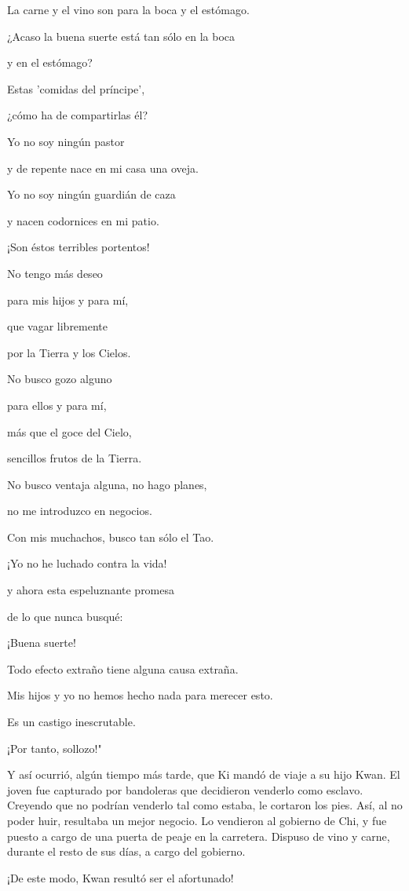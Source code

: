 La carne y el vino son para la boca y el estómago.

¿Acaso la buena suerte está tan sólo en la boca

y en el estómago?

Estas 'comidas del príncipe',

¿cómo ha de compartirlas él?

Yo no soy ningún pastor

y de repente nace en mi casa una oveja.

Yo no soy ningún guardián de caza

y nacen codornices en mi patio.

¡Son éstos terribles portentos!

No tengo más deseo

para mis hijos y para mí,

que vagar libremente

por la Tierra y los Cielos.

No busco gozo alguno

para ellos y para mí,

más que el goce del Cielo,

sencillos frutos de la Tierra.

No busco ventaja alguna, no hago planes,

no me introduzco en negocios.

Con mis muchachos, busco tan sólo el Tao.

¡Yo no he luchado contra la vida!

y ahora esta espeluznante promesa

de lo que nunca busqué:

¡Buena suerte!

Todo efecto extraño tiene alguna causa extraña.

Mis hijos y yo no hemos hecho nada para merecer esto.

Es un castigo inescrutable.

¡Por tanto, sollozo!"

Y así ocurrió, algún tiempo más tarde, que Ki mandó de viaje a su hijo
Kwan. El joven fue capturado por bandoleras que decidieron venderlo como
esclavo. Creyendo que no podrían venderlo tal como estaba, le cortaron
los pies. Así, al no poder huir, resultaba un mejor negocio. Lo
vendieron al gobierno de Chi, y fue puesto a cargo de una puerta de
peaje en la carretera. Dispuso de vino y carne, durante el resto de sus
días, a cargo del gobierno.

¡De este modo, Kwan resultó ser el afortunado!

